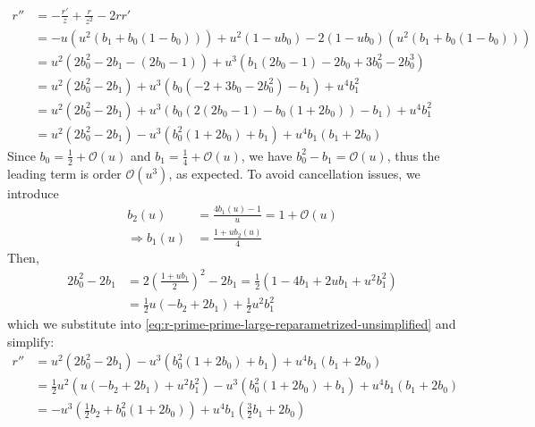 \documentclass{article}
\begin{document}
\begin{align}
  r'' & = -\frac{r'}{z} + \frac{r}{z^2} - 2 r r'                                                                                                  \\
      & = -u(u^2 (b_1 + b_0(1-b_0))) + u^2 (1 - u b_0) - 2 (1 - u b_0) (u^2 (b_1 + b_0(1-b_0)))                                                   \\
      & = u^2 (2 b_0^2 - 2 b_1 - (2 b_0 - 1)) + u^3 (b_1 (2 b_0 - 1) - 2 b_0 + 3b_0^2 - 2 b_0^3)                                                  \\
      & = u^2 (2 b_0^2 - 2 b_1) + u^3 (b_0 (- 2 + 3b_0 - 2 b_0^2) - b_1) + u^4 b_1^2                                                              \\
      & = u^2 (2 b_0^2 - 2 b_1) + u^3 (b_0 (2(2 b_0 - 1) - b_0 (1 + 2 b_0)) - b_1) + u^4 b_1^2                                                    \\
      & = u^2 (2 b_0^2 - 2 b_1) - u^3 (b_0^2 (1 + 2 b_0) + b_1) + u^4 b_1(b_1 + 2 b_0) \label{eq:r-prime-prime-large-reparametrized-unsimplified}
\end{align}
%
Since $b_0 = \frac{1}{2} + \mathcal{O}(u)$ and $b_1 = \frac{1}{4} + \mathcal{O}(u)$, we have $b_0^2 - b_1 = \mathcal{O}(u)$, thus the leading term is order $\mathcal{O}(u^3)$, as expected.
To avoid cancellation issues, we introduce
%
\begin{align}
  b_2(u)             & = \frac{4 b_1(u) - 1}{u} = 1 + \mathcal{O}(u) \label{eq:b2-reparametrized} \\
  \Rightarrow b_1(u) & = \frac{1 + u b_2(u)}{4} \label{eq:b1-reparametrized}
\end{align}
%
Then,
%
\begin{align}
  2 b_0^2 - 2 b_1 & = 2(\frac{1 + u b_1}{2})^2 - 2 b_1 = \frac{1}{2} (1 - 4 b_1 + 2 u b_1 + u^2 b_1^2) \\
                  & = \frac{1}{2} u (-b_2 + 2 b_1) + \frac{1}{2} u^2 b_1^2
\end{align}
%
which we substitute into \cref{eq:r-prime-prime-large-reparametrized-unsimplified} and simplify:
%
\begin{align}
  r'' & = u^2 (2 b_0^2 - 2 b_1) - u^3 (b_0^2 (1 + 2 b_0) + b_1) + u^4 b_1(b_1 + 2 b_0)                          \\
      & = \frac{1}{2} u^2 (u (-b_2 + 2 b_1) + u^2 b_1^2) - u^3 (b_0^2 (1 + 2 b_0) + b_1) + u^4 b_1(b_1 + 2 b_0) \\
      & = -u^3 (\frac{1}{2}b_2 + b_0^2 (1 + 2 b_0)) + u^4 b_1 (\frac{3}{2} b_1 + 2 b_0)
\end{align}
\end{document}

